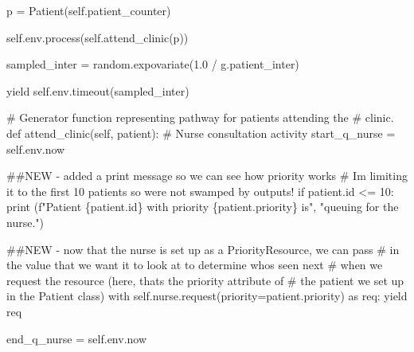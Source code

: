 \documentclass[
  letterpaper,
  DIV=11,
  numbers=noendperiod]{scrreprt}
\newenvironment{Shaded}{\begin{snugshade}}{\end{snugshade}}
\newcommand{\BuiltInTok}[1]{\textcolor[rgb]{0.00,0.23,0.31}{#1}}
\newcommand{\CommentTok}[1]{\textcolor[rgb]{0.37,0.37,0.37}{#1}}
\newcommand{\ControlFlowTok}[1]{\textcolor[rgb]{0.00,0.23,0.31}{#1}}
\newcommand{\DecValTok}[1]{\textcolor[rgb]{0.68,0.00,0.00}{#1}}
\newcommand{\FloatTok}[1]{\textcolor[rgb]{0.68,0.00,0.00}{#1}}
\newcommand{\ImportTok}[1]{\textcolor[rgb]{0.00,0.46,0.62}{#1}}
\newcommand{\KeywordTok}[1]{\textcolor[rgb]{0.00,0.23,0.31}{#1}}
\newcommand{\NormalTok}[1]{\textcolor[rgb]{0.00,0.23,0.31}{#1}}
\newcommand{\OperatorTok}[1]{\textcolor[rgb]{0.37,0.37,0.37}{#1}}
\newcommand{\SpecialCharTok}[1]{\textcolor[rgb]{0.37,0.37,0.37}{#1}}
\newcommand{\SpecialStringTok}[1]{\textcolor[rgb]{0.13,0.47,0.30}{#1}}
\newcommand{\StringTok}[1]{\textcolor[rgb]{0.13,0.47,0.30}{#1}}
\newcommand{\VariableTok}[1]{\textcolor[rgb]{0.07,0.07,0.07}{#1}}
\begin{document}
\begin{tcolorbox}
\begin{Shaded}
\begin{Highlighting}[]
\NormalTok{            p }\OperatorTok{=}\NormalTok{ Patient(}\VariableTok{self}\NormalTok{.patient\_counter)}

            \VariableTok{self}\NormalTok{.env.process(}\VariableTok{self}\NormalTok{.attend\_clinic(p))}

\NormalTok{            sampled\_inter }\OperatorTok{=}\NormalTok{ random.expovariate(}\FloatTok{1.0} \OperatorTok{/}\NormalTok{ g.patient\_inter)}

            \ControlFlowTok{yield} \VariableTok{self}\NormalTok{.env.timeout(sampled\_inter)}

    \CommentTok{\# Generator function representing pathway for patients attending the}
    \CommentTok{\# clinic.}
    \KeywordTok{def}\NormalTok{ attend\_clinic(}\VariableTok{self}\NormalTok{, patient):}
        \CommentTok{\# Nurse consultation activity}
\NormalTok{        start\_q\_nurse }\OperatorTok{=} \VariableTok{self}\NormalTok{.env.now}

        \CommentTok{\#\#NEW {-} added a print message so we can see how priority works}
        \CommentTok{\# I\textquotesingle{}m limiting it to the first 10 patients so we\textquotesingle{}re not swamped by outputs!}
        \ControlFlowTok{if}\NormalTok{ patient.}\BuiltInTok{id} \OperatorTok{\textless{}=} \DecValTok{10}\NormalTok{:}
            \BuiltInTok{print}\NormalTok{ (}\SpecialStringTok{f"Patient }\SpecialCharTok{\{}\NormalTok{patient}\SpecialCharTok{.}\BuiltInTok{id}\SpecialCharTok{\}}\SpecialStringTok{ with priority }\SpecialCharTok{\{}\NormalTok{patient}\SpecialCharTok{.}\NormalTok{priority}\SpecialCharTok{\}}\SpecialStringTok{ is"}\NormalTok{,}
                \StringTok{"queuing for the nurse."}\NormalTok{)}

        \CommentTok{\#\#NEW {-} now that the nurse is set up as a PriorityResource, we can pass}
        \CommentTok{\# in the value that we want it to look at to determine who\textquotesingle{}s seen next}
        \CommentTok{\# when we request the resource (here, that\textquotesingle{}s the priority attribute of}
        \CommentTok{\# the patient we set up in the Patient class)}
        \ControlFlowTok{with} \VariableTok{self}\NormalTok{.nurse.request(priority}\OperatorTok{=}\NormalTok{patient.priority) }\ImportTok{as}\NormalTok{ req:}
            \ControlFlowTok{yield}\NormalTok{ req}

\NormalTok{            end\_q\_nurse }\OperatorTok{=} \VariableTok{self}\NormalTok{.env.now}


\end{Highlighting}
\end{Shaded}
\end{tcolorbox}
\end{document}
